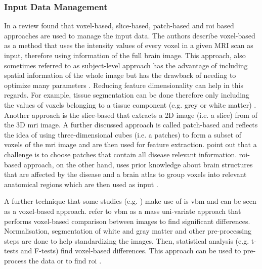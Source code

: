 \subsubsection{Input Data Management} \label{Input Data Management}

In a review \textcite{ebrahimighahnaviehDeepLearningDetect2020} found that voxel-based, slice-based, patch-based and \gls{roi} based approaches are used to manage the input data. 
The authors describe voxel-based as a method that uses the intensity values of every voxel in a given MRI scan as input, therefore using information of the full brain image. This approach, also sometimes referred to as subject-level approach has the advantage of including spatial information of the whole image but has the drawback of needing to optimize many parameters \autocite{wenConvolutionalNeuralNetworks2020}. Reducing feature dimensionality can help in this regards. For example, tissue segmentation can be done therefore only including the values of voxels belonging to a tissue component (e.g. grey or white matter) \autocite{ebrahimighahnaviehDeepLearningDetect2020}. Another approach is the slice-based that extracts a 2D image (i.e. a slice) from of the 3D \gls{mri} image. A further discussed approach is called patch-based  and reflects the idea of using three-dimensional cubes (i.e. a patches) to form a subset of voxels of the \gls{mri} image and are then used for feature extraction. \textcite{ebrahimighahnaviehDeepLearningDetect2020} point out that a challenge is to choose patches that contain all disease relevant information. \gls{roi}-based approach, on the other hand, uses prior knowledge about brain structures that are affected by the disease and a brain atlas to group voxels into relevant anatomical regions which are then used as input \autocite{ebrahimighahnaviehDeepLearningDetect2020}.

A further technique that some studies (e.g. \autocite{akramifardEmphasisLearningFeatures2020, syaifullahMachineLearningDiagnosis2021}) make use of is \gls{vbm} and can be seen as a voxel-based approach. \textcite{mechelliVoxelBasedMorphometryHuman2005} refer to \gls{vbm} as a mass uni-variate approach that performs voxel-based comparison between images to find significant differences. Normalisation, segmentation of white and gray matter and other pre-processing steps are done to help standardizing the images. Then, statistical analysis (e.g. t-tests and F-tests) find voxel-based differences. This approach can be used to pre-process the data or to find \gls{roi} \autocite[see][]{syaifullahMachineLearningDiagnosis2021, akramifardEmphasisLearningFeatures2020}. 


